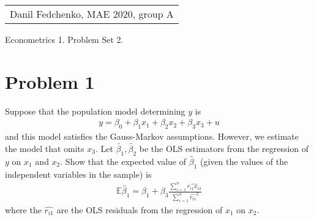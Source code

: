 \documentclass[a4paper]{article}
\newcommand{\expect}{\mathbb{E}}
\begin{document}
	\begin{flushright}
	\begin{tabular}{r}
		Danil Fedchenko, MAE 2020, group A \\
	\end{tabular}
\end{flushright}


\begin{center}
	Econometrics 1. Problem Set 2.
\end{center}
\section*{Problem 1}
Suppose that the population model determining $y$ is
\begin{align*}
y = \beta_0 + \beta_1 x_1 + \beta_2x_2 + \beta_3x_3 + u
\end{align*}
and this model satisfies the Gauss-Markov assumptions. However, we estimate the model that
omits $x_3$. Let $\tilde{\beta_1}, \tilde{\beta_2}$ be the OLS estimators from the regression of $y$ on $x_1$ and $x_2$. Show
that the expected value of $\tilde{\beta_1}$ (given the values of the independent variables in the sample) is
\begin{align*}
\expect \tilde{\beta_1} = \beta_1 + \beta_3 \frac{\sum_{i=1}^n \hat{r_{i1}x_{i3}}}{\sum_{i=1}^n \hat{r_{i1}}^2}
\end{align*}
where the $\hat{r_{i1}}$ are the OLS residuals from the regression of $x_1$ on $x_2$.
\end{document}
